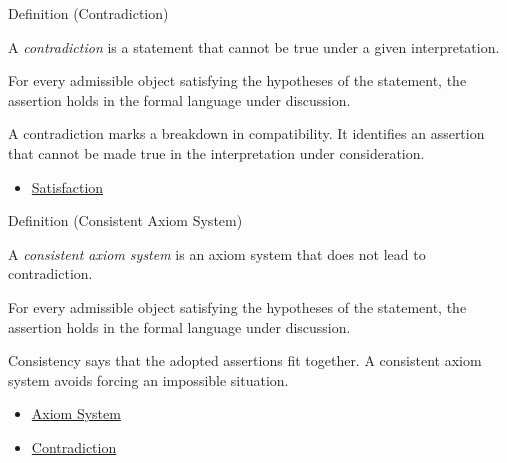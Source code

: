 \begin{definitionbox}{Definition (Contradiction)}
\begin{definition}[Contradiction]
\label{def:axiom-systems-contradiction}
A \emph{contradiction} is a statement that cannot be true under a given
interpretation.
\end{definition}
\end{definitionbox}
\begin{remark*}
For every admissible object satisfying the hypotheses of the statement, the
assertion holds in the formal language under discussion.
\end{remark*}


\begin{remark*}[Interpretation]
A contradiction marks a breakdown in compatibility. It identifies an assertion
that cannot be made true in the interpretation under consideration.
\end{remark*}

\begin{dependencies}
\begin{itemize}
  \item \hyperref[def:axiom-systems-satisfaction]{Satisfaction}
\end{itemize}
\end{dependencies}

\begin{definitionbox}{Definition (Consistent Axiom System)}
\begin{definition}
\label{def:axiom-systems-consistent-axiom-system}
A \emph{consistent axiom system} is an axiom system that does not lead to
contradiction.
\end{definition}
\end{definitionbox}
\begin{remark*}
For every admissible object satisfying the hypotheses of the statement, the
assertion holds in the formal language under discussion.
\end{remark*}


\begin{remark*}[Interpretation]
Consistency says that the adopted assertions fit together. A consistent axiom
system avoids forcing an impossible situation.
\end{remark*}

\begin{dependencies}
\begin{itemize}
  \item \hyperref[def:axiom-system]{Axiom System}
  \item \hyperref[def:axiom-systems-contradiction]{Contradiction}
\end{itemize}
\end{dependencies}

